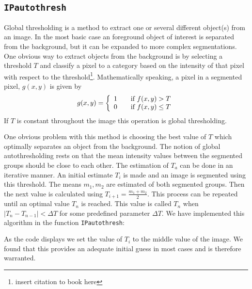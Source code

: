 \subsection{\texttt{IPautothresh}}
Global thresholding is a method to extract one or several different object(s) from an image. 
In the most basic case an foreground object of interest is separated from the background, but it can be expanded to more complex segmentations. 
One obvious way to extract objects from the background is by selecting a threshold \(T\) and classify a pixel to a category based on the intensity of that pixel with respect to the threshold\footnote{insert citation to book here}. 
Mathematically speaking, a pixel in a segmented pixel, \(g(x, y)\) is given by 
\[ 
  g(x,y) = \left\{ 
  \begin{array}{l l}
    1 & \quad \text{if \(f(x, y) > T\)}\\
    0 & \quad \text{if \(f(x, y) \leq T\)}
  \end{array} \right.
\]
If \(T\) is constant throughout the image this operation is global thresholding.

One obvious problem with this method is choosing the best value of \(T\) which optimally separates an object from the background. 
The notion of global autothresholding rests on that the mean intensity values between the segmented groups should be close to each other.
The estimation of \(T_a\) can be done in an iterative manner. 
An initial estimate \(T_i\) is made and an image is segmented using this threshold. 
The means \(m_1, m_2\) are estimated of both segmented groups. 
Then the next value is calculated using \(T_{i+1} = \frac{m_1 + m_2}{2}\).
This process can be repeated until an optimal value \(T_n\) is reached. 
This value is called \(T_n\) when \(\mid T_n - T_{n - 1}\mid < \Delta T\) for some predefined parameter \(\Delta T\).
\clearpage
We have implemented this algorithm in the function \texttt{IPautothresh}:

As the code displays we set the value of \(T_i\) to the middle value of the image. 
We found that this provides an adequate initial guess in most cases and is therefore warranted. 

